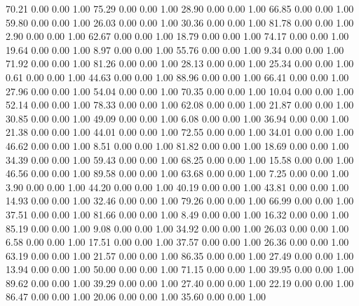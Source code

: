    70.21   0.00   0.00   1.00
   75.29   0.00   0.00   1.00
   28.90   0.00   0.00   1.00
   66.85   0.00   0.00   1.00
   59.80   0.00   0.00   1.00
   26.03   0.00   0.00   1.00
   30.36   0.00   0.00   1.00
   81.78   0.00   0.00   1.00
    2.90   0.00   0.00   1.00
   62.67   0.00   0.00   1.00
   18.79   0.00   0.00   1.00
   74.17   0.00   0.00   1.00
   19.64   0.00   0.00   1.00
    8.97   0.00   0.00   1.00
   55.76   0.00   0.00   1.00
    9.34   0.00   0.00   1.00
   71.92   0.00   0.00   1.00
   81.26   0.00   0.00   1.00
   28.13   0.00   0.00   1.00
   25.34   0.00   0.00   1.00
    0.61   0.00   0.00   1.00
   44.63   0.00   0.00   1.00
   88.96   0.00   0.00   1.00
   66.41   0.00   0.00   1.00
   27.96   0.00   0.00   1.00
   54.04   0.00   0.00   1.00
   70.35   0.00   0.00   1.00
   10.04   0.00   0.00   1.00
   52.14   0.00   0.00   1.00
   78.33   0.00   0.00   1.00
   62.08   0.00   0.00   1.00
   21.87   0.00   0.00   1.00
   30.85   0.00   0.00   1.00
   49.09   0.00   0.00   1.00
    6.08   0.00   0.00   1.00
   36.94   0.00   0.00   1.00
   21.38   0.00   0.00   1.00
   44.01   0.00   0.00   1.00
   72.55   0.00   0.00   1.00
   34.01   0.00   0.00   1.00
   46.62   0.00   0.00   1.00
    8.51   0.00   0.00   1.00
   81.82   0.00   0.00   1.00
   18.69   0.00   0.00   1.00
   34.39   0.00   0.00   1.00
   59.43   0.00   0.00   1.00
   68.25   0.00   0.00   1.00
   15.58   0.00   0.00   1.00
   46.56   0.00   0.00   1.00
   89.58   0.00   0.00   1.00
   63.68   0.00   0.00   1.00
    7.25   0.00   0.00   1.00
    3.90   0.00   0.00   1.00
   44.20   0.00   0.00   1.00
   40.19   0.00   0.00   1.00
   43.81   0.00   0.00   1.00
   14.93   0.00   0.00   1.00
   32.46   0.00   0.00   1.00
   79.26   0.00   0.00   1.00
   66.99   0.00   0.00   1.00
   37.51   0.00   0.00   1.00
   81.66   0.00   0.00   1.00
    8.49   0.00   0.00   1.00
   16.32   0.00   0.00   1.00
   85.19   0.00   0.00   1.00
    9.08   0.00   0.00   1.00
   34.92   0.00   0.00   1.00
   26.03   0.00   0.00   1.00
    6.58   0.00   0.00   1.00
   17.51   0.00   0.00   1.00
   37.57   0.00   0.00   1.00
   26.36   0.00   0.00   1.00
   63.19   0.00   0.00   1.00
   21.57   0.00   0.00   1.00
   86.35   0.00   0.00   1.00
   27.49   0.00   0.00   1.00
   13.94   0.00   0.00   1.00
   50.00   0.00   0.00   1.00
   71.15   0.00   0.00   1.00
   39.95   0.00   0.00   1.00
   89.62   0.00   0.00   1.00
   39.29   0.00   0.00   1.00
   27.40   0.00   0.00   1.00
   22.19   0.00   0.00   1.00
   86.47   0.00   0.00   1.00
   20.06   0.00   0.00   1.00
   35.60   0.00   0.00   1.00
